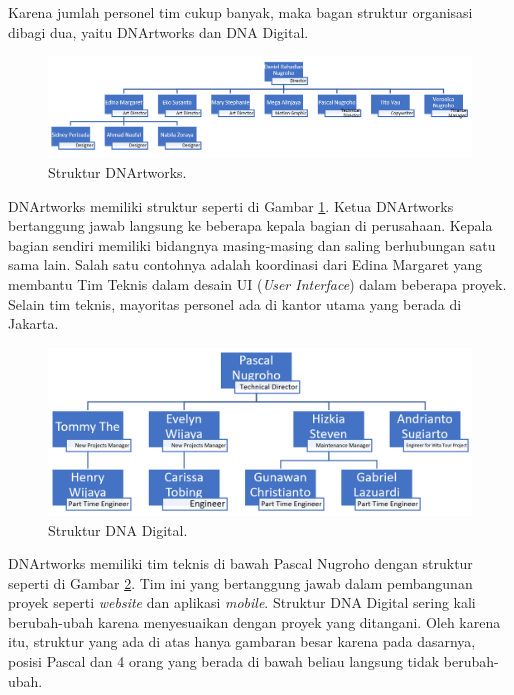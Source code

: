 Karena jumlah personel tim cukup banyak, maka bagan struktur organisasi dibagi dua, yaitu DNArtworks dan DNA Digital.

\begin{figure}
\center
\includegraphics[width=\textwidth,height=\textheight,keepaspectratio]{Gambar/Struktur DNArtworks.PNG}
\caption{Struktur DNArtworks.}
    \label{img:strukturdnartworks}
\end{figure}

DNArtworks memiliki struktur seperti di Gambar \ref{img:strukturdnartworks}. Ketua DNArtworks bertanggung jawab langsung ke beberapa kepala bagian di perusahaan. Kepala bagian sendiri memiliki bidangnya masing-masing dan saling berhubungan satu sama lain. Salah satu contohnya adalah koordinasi dari Edina Margaret yang membantu Tim Teknis dalam desain UI (\textit{User Interface}) dalam beberapa proyek. Selain tim teknis, mayoritas personel ada di kantor utama yang berada di Jakarta.

\begin{figure}[H]
\center
\includegraphics[width=\textwidth,height=\textheight,keepaspectratio]{Gambar/Struktur DNA Digital.PNG}
\caption{Struktur DNA Digital.}
\label{img:strukturdnadigital}
\end{figure}

DNArtworks memiliki tim teknis di bawah Pascal Nugroho dengan struktur seperti di Gambar \ref{img:strukturdnadigital}. Tim ini yang bertanggung jawab dalam pembangunan proyek seperti \textit{website} dan aplikasi \textit{mobile}. Struktur DNA Digital sering kali berubah-ubah karena menyesuaikan dengan proyek yang ditangani. Oleh karena itu, struktur yang ada di atas hanya gambaran besar karena pada dasarnya, posisi Pascal dan 4 orang yang berada di bawah beliau langsung tidak berubah-ubah.


